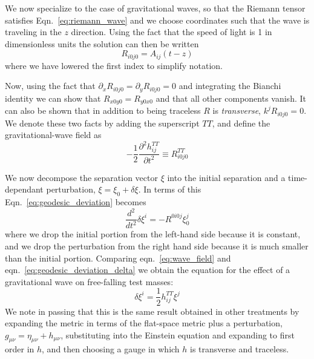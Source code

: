 We now specialize to the case of gravitational waves, so that the
Riemann tensor satisfies Eqn.~\ref{eq:riemann_wave} and we choose
coordinates such that the wave is traveling in the $z$ direction.
Using the fact that the speed of light is 1 in dimensionless units the
solution can then be written
%
\begin{equation*}
R_{i 0 j 0} = A_{ij}(t - z)
\end{equation*}
%
where we have lowered the first index to simplify notation.

Now, using the fact that $\partial_x R_{i0j0} = \partial_y R_{i0j0}
= 0$ and integrating the Bianchi identity we can show that
$R_{x 0 y 0} = R_{y 0 x 0}$ and that all other components vanish.
It can also be shown that in addition to being traceless $R$ is
\emph{transverse}, $k^j R_{i0j0} = 0$.  We denote these two facts by
adding the superscript $TT$, and define the gravitational-wave field as
%
\begin{equation}
\label{eq:wave_field}
-\frac{1}{2} \frac{\partial^2 h_{ij}^{TT}}{\partial t^2}
\equiv R^{TT}_{i0j0}
\end{equation}

We now decompose the separation vector $\xi$ into the initial
separation and a time-dependant perturbation, $\xi = \xi_0 + \delta
\xi$.  In terms of this Eqn.~\ref{eq:geodesic_deviation} becomes
%
\begin{equation}
\label{eq:geodesic_deviation_delta}
\frac{d^2}{dt^2} \delta \xi^i = -R^{0 i 0 j} \xi_0^j
\end{equation}
%
where we drop the initial portion from the left-hand side because it
is constant, and we drop the perturbation from the right hand side
because it is much smaller than the initial portion.  Comparing
eqn.~\ref{eq:wave_field} and eqn.~\ref{eq:geodesic_deviation_delta}
we obtain the equation for the effect of a gravitational wave on
free-falling test masses:
%
\begin{equation}
\label{eq:wave_effect}
\delta \xi^i = \frac{1}{2} h^{TT}_{ij} \xi^j
\end{equation}
%
We note in passing that this is the same result obtained in other
treatments by expanding the metric in terms of the flat-space metric
plus a perturbation, $g_{\mu\nu} = \eta_{\mu\nu} + h_{\mu\nu}$,
substituting into the Einstein equation and expanding to first order
in $h$, and then choosing a gauge in which $h$ is transverse and
traceless.

